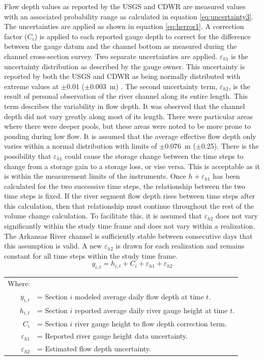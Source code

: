 Flow depth values as reported by the USGS and CDWR are measured values with an associated probability range as calculated in equation \ref{eq:uncertainty3}.  The uncertainties are applied as shown in equation \ref{eq:herror1}.  A correction factor ($ C_{i} $) is applied to each reported gauge depth to correct for the difference between the gauge datum and the channel bottom as measured during the channel cross-section survey.  Two separate uncertainties are applied.  $ \varepsilon_{h1} $ is the uncertainty distribution as described by the gauge owner.  This uncertainty is reported by both the USGS and CDWR as being normally distributed with extreme values at $\pm$\SI{0.01}{\foot} ($\pm$\SI{0.003}{\meter}) \parencite{USGSPL89}.  The second uncertainty term, $ \varepsilon_{h2} $, is the result of personal observation of the river channel along its entire length.  This term describes the variability in flow depth.  It was observed that the channel depth did not vary greatly along most of its length.  There were particular areas where there were deeper pools, but these areas were noted to be more prone to ponding during low flow.  It is assumed that the average effective flow depth only varies within a normal distribution with limits of $\pm$\SI{0.076}{\meter} ($\pm$\SI{0.25}{\foot}).  There is the possibility that $\varepsilon_{h1}$ could cause the storage change between the time steps to change from a storage gain to a storage loss, or vise versa.  This is acceptable as it is within the measurement limits of the instruments.  Once $h+\varepsilon_{h1}$ has been calculated for the two successive time steps, the relationship between the two time steps is fixed.  If the river segment flow depth rises between time steps after this calculation, then that relationship must continue throughout the rest of the volume change calculation.  To facilitate this, it is assumed that $\varepsilon_{h2}$ does not vary significantly within the study time frame and does not vary within a realization.  The Arkansas River channel is sufficiently stable between consecutive days that this assumption is valid.  A new $\varepsilon_{h2}$ is drawn for each realization and remains constant for all time steps within the study time frame.
\begin{equation}
	y_{i,t}=h_{i,t}+C_{i}+\varepsilon_{h1}+\varepsilon_{h2}
	\label{eq:herror1}
\end{equation}
\begin{tabular}{r p{5.5in}}
	Where: & \\
	$y_{i,t}$  & = Section $ i $ modeled average daily flow depth at time $ t $.\\
	$h_{i,t}$  & = Section $ i $ reported average daily river gauge height at time $ t $.\\
	$ C_{i} $ & = Section $ i $ river gauge height to flow depth correction term.\\
	$\varepsilon_{h1}$ & = Reported river gauge height data uncertainty.\\
	$\varepsilon_{h2}$ & = Estimated flow depth uncertainty.\\
\end{tabular}\\


